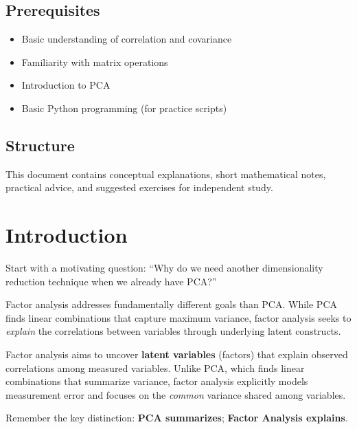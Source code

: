 \documentclass[a4paper]{tufte-book}
\newcommand{\tecbluetext}[1]{\textcolor{tecblue}{\textbf{#1}}}
\newcommand{\tecorangetext}[1]{\textcolor{tecorange}{\textbf{#1}}}
\begin{document}

\subsection{Prerequisites}
\begin{itemize}
  \item Basic understanding of correlation and covariance
  \item Familiarity with matrix operations
  \item Introduction to PCA
  \item Basic Python programming (for practice scripts)
\end{itemize}

\subsection{Structure}
This document contains conceptual explanations, short mathematical notes, practical advice, and suggested exercises for independent study.

\section{Introduction}

\begin{pedagogicalnote}
Start with a motivating question: ``Why do we need another dimensionality reduction technique when we already have PCA?'' 

Factor analysis addresses fundamentally different goals than PCA. While PCA finds linear combinations that capture maximum variance, factor analysis seeks to \textit{explain} the correlations between variables through underlying latent constructs.
\end{pedagogicalnote}

Factor analysis aims to uncover \textbf{latent variables} (factors) that explain observed correlations among measured variables. Unlike PCA, which finds linear combinations that summarize variance, factor analysis explicitly models measurement error and focuses on the \textit{common} variance shared among variables.

\begin{learningtip}
Remember the key distinction: \tecbluetext{PCA summarizes}; \tecorangetext{Factor Analysis explains}.
\end{learningtip}
\end{document}

